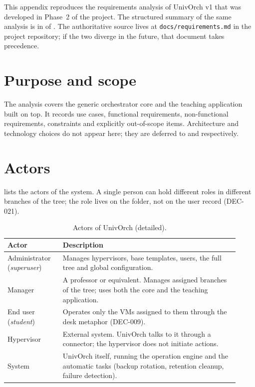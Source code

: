 
\label{ap:requirements}

This appendix reproduces the requirements analysis of UnivOrch v1
that was developed in Phase~2 of the project. The structured
summary of the same analysis is in  of
. The authoritative source lives at
\texttt{docs/requirements.md} in the project repository; if the two
diverge in the future, that document takes precedence.

\section{Purpose and scope}

The analysis covers the generic orchestrator core and the teaching
application built on top. It records use cases, functional
requirements, non-functional requirements, constraints and
explicitly out-of-scope items. Architecture and technology choices
do not appear here; they are deferred to  and
 respectively.

\section{Actors}

 lists the actors of the system. A single
person can hold different roles in different branches of the tree;
the role lives on the folder, not on the user record (DEC-021).

\begin{table}[ht]
  \centering
  \small
  \begin{tabular}{p{0.22\linewidth} p{0.70\linewidth}}
    \toprule
    \textbf{Actor} & \textbf{Description} \\
    \midrule
    Administrator (\emph{superuser}) &
    Manages hypervisors, base templates, users, the full tree and
    global configuration. \\
    Manager &
    A professor or equivalent. Manages assigned branches of the
    tree; uses both the core and the teaching application. \\
    End user (\emph{student}) &
    Operates only the VMs assigned to them through the desk
    metaphor (DEC-009). \\
    Hypervisor &
    External system. UnivOrch talks to it through a connector;
    the hypervisor does not initiate actions. \\
    System &
    UnivOrch itself, running the operation engine and the
    automatic tasks (backup rotation, retention cleanup, failure
    detection). \\
    \bottomrule
  \end{tabular}
  \caption{Actors of UnivOrch (detailed).}
  \label{tab:actors-detail}
\end{table}

